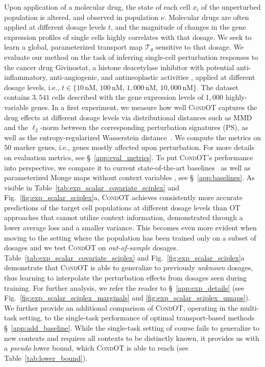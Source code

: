  Upon application of a molecular drug, the state of each cell $x_i$ of the unperturbed population is altered, and observed in population $\nu$.
Molecular drugs are often applied at different dosage levels $t$, and the magnitude of changes in the gene expression profiles of single cells highly correlates with that dosage. 
We seek to learn a global, parameterized transport map $\mathcal{T}_\theta$ sensitive to that dosage.%
We evaluate our method on the task of inferring single-cell perturbation responses to the cancer drug Givinostat, a histone deacetylase inhibitor with potential anti-inflammatory, anti-angiogenic, and antineoplastic activities \citep{srivatsan2020massively}, applied at different dosage levels, i.e., $t \in \{10\,$nM, $100\,$nM, $1,000\,$nM, $10,000\,$nM$\}$. The dataset contains $3,541$ cells described with the gene expression levels of $1,000$ highly-variable genes.
In a first experiment, we measure how well \textsc{CondOT} captures the drug effects at different dosage levels via distributional distances such as MMD~\citep{gretton2012kernel} and the $\ell_2$-norm between the corresponding perturbation signatures (PS), as well as the entropy-regularized Wasserstein distance~\citep{cuturi2013sinkhorn}. We compute the metrics on 50 marker genes, i.e., genes mostly affected upon perturbation. For more details on evaluation metrics, see \S~\ref{app:eval_metrics}. To put \textsc{CondOT}'s performance into perspective, we compare it to current state-of-the-art baselines~\citep{lotfollahi2021compositional} as well as parameterized Monge maps without context variables \citep[\textsc{ICNN OT}]{bunne2021learning, makkuva2020optimal}, see \S~\ref{app:baselines}.
As visible in Table~\ref{tab:exp_scalar_covariate_sciplex} and Fig.~\ref{fig:exp_scalar_sciplex}a, \textsc{CondOT} achieves consistently more accurate predictions of the target cell populations at different dosage levels than OT approaches that cannot utilize context information, demonstrated through a lower average loss and a smaller variance.
This becomes even more evident when moving to the setting where the population has been trained only on a subset of dosages and we test \textsc{CondOT} on \emph{out-of-sample} dosages. Table~\ref{tab:exp_scalar_covariate_sciplex} and Fig.~\ref{fig:exp_scalar_sciplex}a demonstrate that \textsc{CondOT} is able to generalize to previously \emph{unknown} dosages, thus learning to interpolate the perturbation effects from dosages seen during training. For further analysis, we refer the reader to \S~\ref{app:exp_details} (see Fig.~\ref{fig:exp_scalar_sciplex_marginals} and \ref{fig:exp_scalar_sciplex_umaps}). We further provide an additional comparison of \textsc{CondOT}, operating in the multi-task setting, to the single-task performance of optimal transport-based methods \S~\ref{app:add_baseline}. While the single-task setting of course fails to generalize to new contexts and requires all contexts to be distinctly known, it provides us with a \textit{pseudo} lower bound, which \textsc{CondOT} is able to reach (see Table~\ref{tab:lower_bound}).
